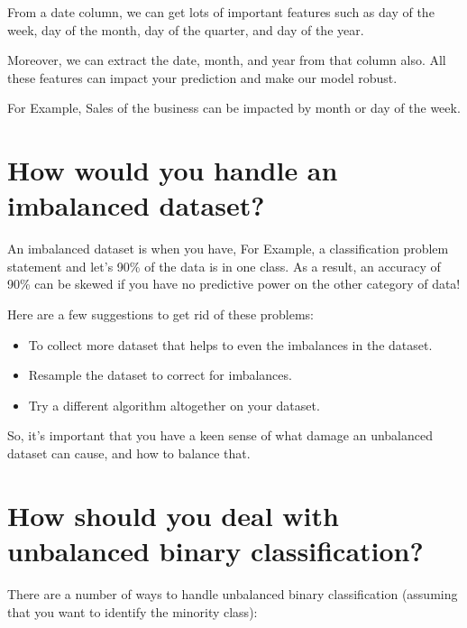\documentclass[
]{book}
\begin{document}
From a date column, we can get lots of important features such as day of the week, day of the month, day of the quarter, and day of the year.

Moreover, we can extract the date, month, and year from that column also. All these features can impact your prediction and make our model robust.

For Example, Sales of the business can be impacted by month or day of the week.

\hypertarget{how-would-you-handle-an-imbalanced-dataset}{%
\section{How would you handle an imbalanced dataset?}\label{how-would-you-handle-an-imbalanced-dataset}}

An imbalanced dataset is when you have, For Example, a classification problem statement and let's 90\% of the data is in one class. As a result, an accuracy of 90\% can be skewed if you have no predictive power on the other category of data!

Here are a few suggestions to get rid of these problems:

\begin{itemize}
\item
  To collect more dataset that helps to even the imbalances in the dataset.
\item
  Resample the dataset to correct for imbalances.
\item
  Try a different algorithm altogether on your dataset.
\end{itemize}

So, it's important that you have a keen sense of what damage an unbalanced dataset can cause, and how to balance that.

\hypertarget{how-should-you-deal-with-unbalanced-binary-classification}{%
\section{How should you deal with unbalanced binary classification?}\label{how-should-you-deal-with-unbalanced-binary-classification}}

There are a number of ways to handle unbalanced binary classification (assuming that you want to identify the minority class):
\end{document}
